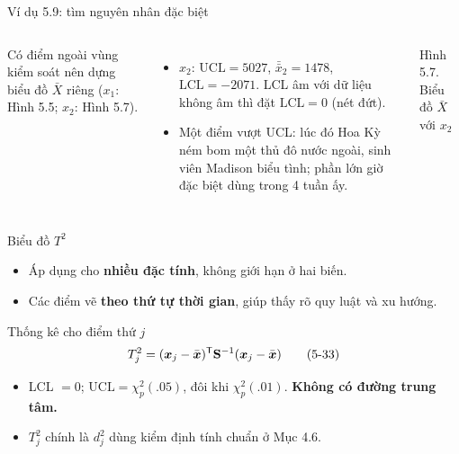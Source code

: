 \begin{frame}{Ví dụ 5.9: tìm nguyên nhân đặc biệt}
  \begin{columns}[T]
    \small
    Có điểm ngoài vùng kiểm soát nên dựng biểu đồ \(\bar{X}\) riêng (\(x_1\): Hình 5.5; \(x_2\): Hình 5.7).
    \begin{itemize}
      \item \(x_2\): \(\mathrm{UCL}=5027\), \(\bar{\bar{x}}_2=1478\), \(\mathrm{LCL}=-2071\). LCL âm với dữ liệu không âm thì đặt \(\mathrm{LCL}=0\) (nét đứt).
      \item Một điểm vượt UCL: lúc đó Hoa Kỳ ném bom một thủ đô nước ngoài, sinh viên Madison biểu tình; phần lớn giờ đặc biệt dùng trong 4 tuần ấy.
    \end{itemize}
    \centering
    \resizebox{\linewidth}{!}{}

    {\scriptsize Hình 5.7. Biểu đồ \(\bar{X}\) với \(x_2\)}
  \end{columns}
\end{frame}

\begin{frame}{Biểu đồ \(T^2\)}
  \begin{itemize}
    \item Áp dụng cho \textbf{nhiều đặc tính}, không giới hạn ở hai biến.
    \item Các điểm vẽ \textbf{theo thứ tự thời gian}, giúp thấy rõ quy luật và xu hướng.
  \end{itemize}
  \begin{block}{Thống kê cho điểm thứ \(j\)}
    \begin{equation}
      T_j^2=(\boldsymbol{x}_j-\bar{\boldsymbol{x}})^{\mathsf T}\mathbf{S}^{-1}(\boldsymbol{x}_j-\bar{\boldsymbol{x}})
      \tag{5-33}
    \end{equation}
  \end{block}
  \begin{itemize}
    \item LCL \(=0\); \(\mathrm{UCL}=\chi^2_p(.05)\), đôi khi \(\chi^2_p(.01)\). \textbf{Không có đường trung tâm.}
    \item \(T_j^2\) chính là \(d_j^2\) dùng kiểm định tính chuẩn ở Mục 4.6.
  \end{itemize}
\end{frame}

